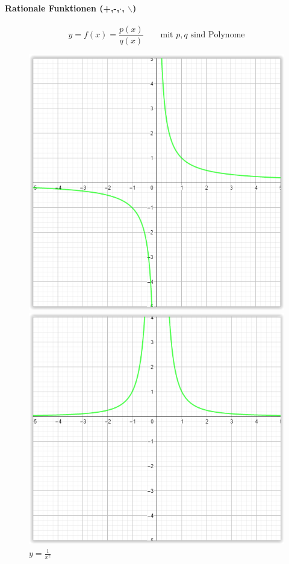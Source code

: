 \documentclass[12pt,a4paper]{article}%
\numberwithin{equation}{section}
\newcommand{\subsubsubsection}{\paragraph}
\numberwithin{equation}{subsection}
\begin{document}
		\vspace{-0.5cm}
		\newpage
		\subsubsubsection{Rationale Funktionen (+,-,$\cdot$, $\backslash$)}
		\begin{equation}
		  y = f(x) = \frac{p(x)}{q(x)} \qquad \text{mit } p,q \text{ sind Polynome}
		\end{equation}
		\begin{figure}[H] 
		\centering
		\begin{minipage}{.5\textwidth}
		  \centering
		  \includegraphics[width=0.6\linewidth]{funktionen_pole_1.png}
		  \caption{$y = \frac{1}{x}$}
		  \label{fig:funkt_pole_1}
		\end{minipage}%
		\begin{minipage}{.5\textwidth}
		  \centering
		  \includegraphics[width=0.65\linewidth]{funktionen_pole_2.png}
		  \caption{$y = \frac{1}{x^2}$}
		  \label{fig:funkt_pole_2}
		\end{minipage}
		\end{figure}
		
\end{document}
